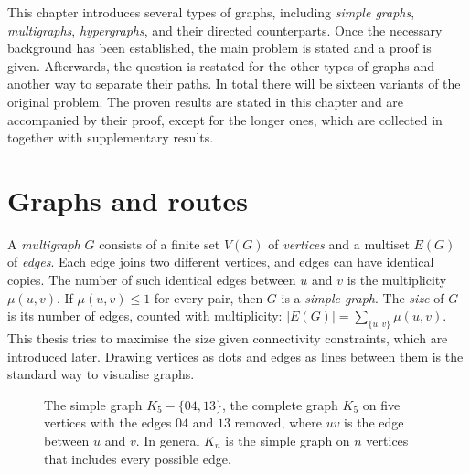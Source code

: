 This chapter introduces several types of graphs, including \emph{simple graphs}, \emph{multigraphs}, \emph{hypergraphs}, and their directed counterparts. Once the necessary background has been established, the main problem is stated and a proof is given. Afterwards, the question is restated for the other types of graphs and another way to separate their paths. In total there will be sixteen variants of the original problem. The proven results are stated in this chapter and are accompanied by their proof, except for the longer ones, which are collected in  together with supplementary results.

\section{Graphs and routes}\label{sec:graphs}

A \emph{multigraph} $G$ consists of a finite set $V(G)$ of \emph{vertices} and a multiset $E(G)$ of \emph{edges}.
Each edge joins two different vertices, and edges can have identical copies.
The number of such identical edges between $u$ and $v$ is the multiplicity $\mu(u,v)$.
If $\mu(u,v)\le1$ for every pair, then $G$ is a \emph{simple graph}.
The \emph{size} of $G$ is its number of edges, counted with multiplicity: $|E(G)|=\sum_{\{u,v\}}\mu(u,v)$.
This thesis tries to maximise the size given connectivity constraints, which are introduced later.
Drawing vertices as dots and edges as lines between them is the standard way to visualise graphs.

\begin{figure}[ht]
\centering
{}
\caption{The simple graph $K_5-\{04,13\}$, the complete graph $K_5$ on five vertices with the edges $04$ and $13$ removed, where $uv$ is the edge between $u$ and $v$. In general $K_n$ is the simple graph on $n$ vertices that includes every possible edge.}
\label{fig:k5-example}
\end{figure}

